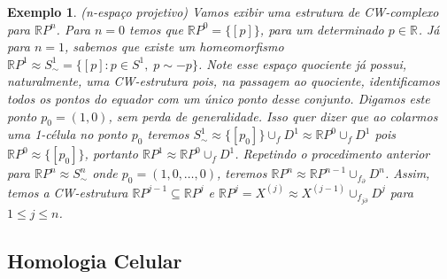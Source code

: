 \documentclass[12pt]{book}
\newtheorem{exemplo}[teorema]{Exemplo}
\newcommand{\classe}[1]{[#1]}
\newcommand{\real}[1]{\mathbb{R}^{#1}}
\newcommand{\realprojetivo}[1]{\mathbb{R}P^{#1}}
\newcommand{\skeleton}[1]{X^{(#1)}}
\begin{document}
	\begin{exemplo}
		(n-espaço projetivo) Vamos exibir uma estrutura de CW-complexo para $\realprojetivo{n}$. Para $n=0$ temos que $\realprojetivo{0} = \{\classe{p}\}$, para um determinado $p \in \real{}$. Já para $n=1$, sabemos que existe um homeomorfismo $\realprojetivo{1} \approx S^{1}_{\sim} = \{\classe{p}: p \in S^{1},\; p \sim -p\}$. Note esse espaço quociente já possui, naturalmente, uma CW-estrutura pois, na passagem ao quociente, identificamos todos os pontos do equador com um único ponto desse conjunto. Digamos este ponto $p_{0} = (1,0)$, sem perda de generalidade. Isso quer dizer que ao colarmos uma 1-célula no ponto $p_{0}$ teremos $S^{1}_{\sim} \approx \{[p_{0}]\} \cup_{f}D^{1} \approx \realprojetivo{0}\cup_{f}D^{1} $ pois $\realprojetivo{0} \approx \{[p_{0}]\}$, portanto $ \realprojetivo{1} \approx \realprojetivo{0}\cup_{f}D^{1}$. Repetindo o procedimento anterior para $\realprojetivo{n} \approx S^{n}_{\sim} $ onde $p_{0} = (1,0,\dots, 0)$, teremos $\realprojetivo{n} \approx \realprojetivo{n-1} \cup_{f_{\partial}}D^{n}$. Assim, temos a CW-estrutura $\realprojetivo{j-1} \subseteq \realprojetivo{j}$ e $\realprojetivo{j} = \skeleton{j} \approx \skeleton{j-1}\cup_{f_{j\partial}}D^{j}$ para $1\leq j \leq n$.
	\end{exemplo}
	
	\subsection{Homologia Celular}
	
\end{document}
